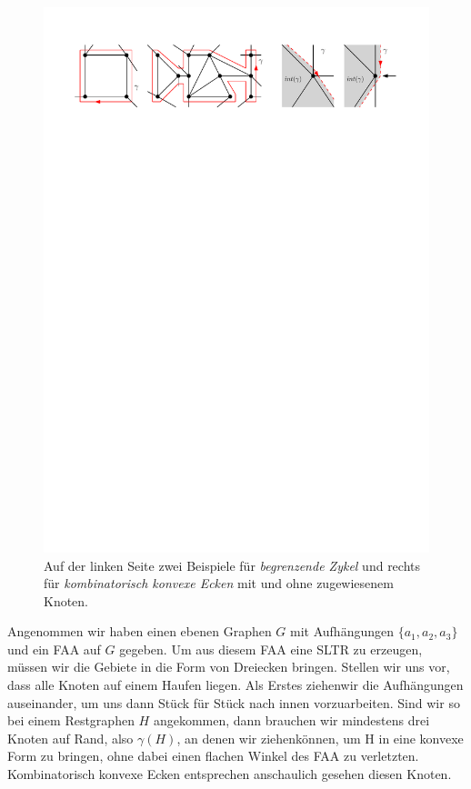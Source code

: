 \begin{figure}[h]
	\centering
  \includegraphics[width=1\textwidth]{corner_def.pdf}
  \caption{Auf der linken Seite zwei Beispiele für \textit{begrenzende Zykel} und rechts für \textit{kombinatorisch konvexe Ecken} mit und ohne zugewiesenem Knoten.}
  \label{corner_def}
\end{figure}

\begin{remark}
Angenommen wir haben einen ebenen Graphen $G$ mit Aufhängungen $\{a_1,a_2,a_3\}$ und ein FAA auf $G$ gegeben. Um aus diesem FAA eine SLTR zu erzeugen, müssen wir die Gebiete in die Form von Dreiecken bringen. Stellen wir uns vor, dass alle Knoten auf einem Haufen liegen. Als Erstes \glqq ziehen\grqq{ }wir die Aufhängungen auseinander, um uns dann Stück für Stück nach innen vorzuarbeiten. Sind wir so bei einem Restgraphen $H$ angekommen, dann brauchen wir mindestens drei Knoten auf Rand, also $\gamma(H)$, an denen wir \glqq ziehen\grqq{ }können, um H in eine konvexe Form zu bringen, ohne dabei einen flachen Winkel des FAA zu verletzten. Kombinatorisch konvexe Ecken entsprechen anschaulich gesehen diesen Knoten.
\end{remark}

